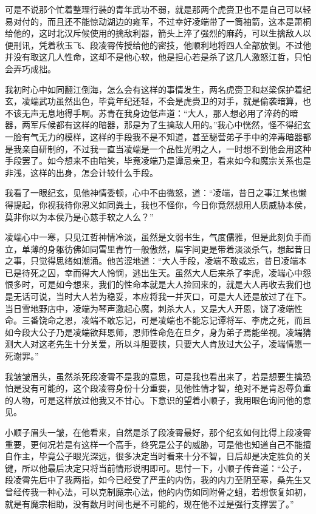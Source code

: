可是不说那个忙着整理行装的青年武功不弱，就是那两个虎赍卫也不是自己可以轻易对付的，而且还不能惊动湖边的雍军，不过幸好凌端带了一筒袖箭，这本是萧桐给他的，这时北汉斥候使用的擒敌利器，箭头上淬了强烈的麻药，可以生擒敌人以便刑讯，凭着秋玉飞、段凌霄传授给他的密技，他顺利地将四人全部放倒。不过他并没有取这几人性命，这却不是他心软，他是担心若是杀了这几人激怒江哲，只怕会弄巧成拙。

我初时心中如同翻江倒海，怎么会有这样的事情发生，两名虎赍卫和赵梁保护着纪玄，凌端武功虽然出色，毕竟年纪还轻，不会是虎赍卫的对手，就是偷袭暗算，也不该无声无息地得手啊。苏青在我身边低声道：“大人，那人想必用了淬药的暗器，两军斥候都有这样的暗器，那是为了生擒敌人用的。”我心中恍然，怪不得纪玄一脸有气无力的模样，这样的手段我不是不知道，甚至秘营弟子手中的淬毒暗器都是我亲自研制的，不过我一直当凌端是一个品性光明之人，一时想不到他会用这种手段罢了。如今想来不由暗笑，毕竟凌端乃是谭忌亲卫，看来如今和魔宗关系也是非浅，这样的出身，怎会计较什么手段。

我看了一眼纪玄，见他神情委顿，心中不由微怒，道：“凌端，昔日之事江某也懒得提起，你视我待你恩义如同粪土，我也不怪你，今日你竟然想用人质威胁本侯，莫非你以为本侯乃是心慈手软之人么？”

凌端心中一寒，只见江哲神情冷淡，虽然是文弱书生，气度儒雅，但是此刻负手而立，单薄的身躯彷佛如同雪里青竹一般傲然，眉宇间更是带着淡淡杀气，想起昔日之事，只觉得思绪如潮涌。他苦涩地道：“大人手段，凌端不敢或忘，昔日凌端本已是待死之囚，幸而得大人怜悯，逃出生天。虽然大人后来杀了李虎，凌端心中怨恨多时，可是如今想来，我们的性命本就是大人捡回来的，就是大人再收去我们也是无话可说，当时大人若为稳妥，本应将我一并灭口，可是大人还是放过了在下。当日雪地野店中，凌端为琴声激起心魔，刺杀大人，又是大人开恩，饶了凌端性命。三番饶命之恩，凌端不敢忘记，可是凌端也不能忘记谭将军、李虎之死，而且如今段大公子乃是凌端欲拜恩师，恩师性命危在旦夕，身为弟子焉能坐视。凌端猜测大人对这老先生十分关爱，所以斗胆要挟，只要大人肯放过大公子，凌端情愿一死谢罪。”

我皱皱眉头，虽然杀死段凌霄不是我的意思，可是我也看出来了，若是想要生擒恐怕是没有可能的，这个段凌霄身份十分重要，见他性情才智，绝对不是肯忍辱负重的人物，可是这样放过他我又不甘心。下意识的望着小顺子，我用眼色询问他的意见。

小顺子眉头一皱，在他看来，自然是杀了段凌霄最好，那个纪玄如何比得上段凌霄重要，更何况若是有这样一个高手，终究是公子的威胁，可是他也知道自己不能擅自作主，毕竟公子眼光深远，很多决定当时看来十分不智，日后却是决定胜负的关键，所以他最后决定只将当前情形说明即可。思忖一下，小顺子传音道：“公子，段凌霄先后中了我两指，如今已经受了严重的内伤，我的内力至阴至寒，桑先生又曾经传我一种心法，可以克制魔宗心法，他的内伤如同附骨之蛆，若想恢复如初，就是有魔宗相助，没有数月时间也是不可能的，现在他不过是强行支撑罢了。”

